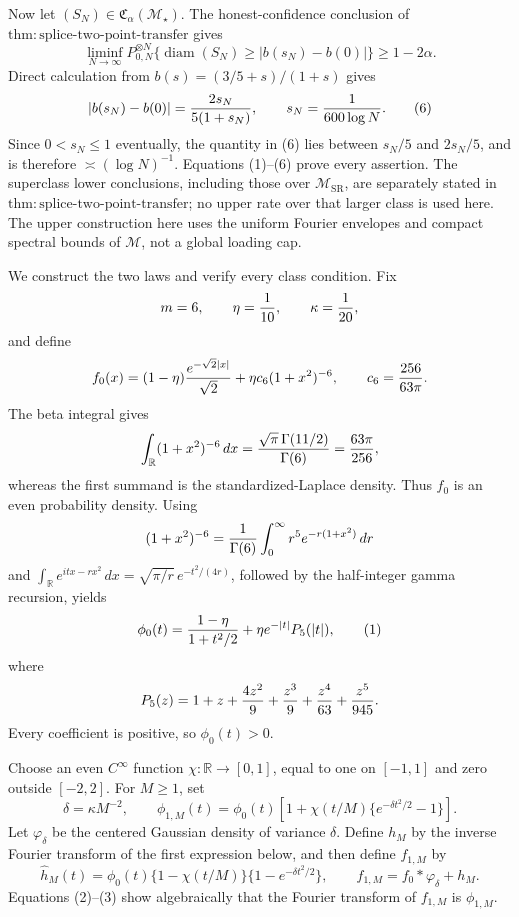 Now let \((S_N)\in\mathfrak C_\alpha(\mathcal M_\star)\).  The honest-confidence conclusion of \(\mathrm{thm:splice\text{-}two\text{-}point\text{-}transfer}\) gives
\[
 \liminf_{N\to\infty}P_{0,N}^{\otimes N}
 \{\operatorname{diam}(S_N)\ge|b(s_N)-b(0)|\}
 \ge1-2\alpha. \tag{5}
\]
Direct calculation from \(b(s)=(3/5+s)/(1+s)\) gives
\[
 |b(s_N)-b(0)|={2s_N\over5(1+s_N)},
 \qquad s_N={1\over600\log N}. \tag{6}
\]
Since \(0<s_N\le1\) eventually, the quantity in (6) lies between \(s_N/5\) and \(2s_N/5\), and is therefore \(\asymp(\log N)^{-1}\).  Equations (1)--(6) prove every assertion.  The superclass lower conclusions, including those over \(\mathcal M_{\mathrm{SR}}\), are separately stated in \(\mathrm{thm:splice\text{-}two\text{-}point\text{-}transfer}\); no upper rate over that larger class is used here.  The upper construction here uses the uniform Fourier envelopes and compact spectral bounds of \(\mathcal M\), not a global loading cap.

We construct the two laws and verify every class condition.  Fix
\[
 m=6,\qquad \eta={1\over10},\qquad \kappa={1\over20},
\]
and define
\[
 f_0(x)=(1-\eta){e^{-\sqrt2|x|}\over\sqrt2}
       +\eta c_6(1+x^2)^{-6},
 \qquad c_6={256\over63\pi}.
\]
The beta integral gives
\[
 \int_{\mathbb R}(1+x^2)^{-6}\,dx
 ={\sqrt\pi\,\Gamma(11/2)\over\Gamma(6)}={63\pi\over256},
\]
whereas the first summand is the standardized-Laplace density.  Thus \(f_0\) is an even probability density.  Using
\[
 (1+x^2)^{-6}={1\over\Gamma(6)}
 \int_0^\infty r^5e^{-r(1+x^2)}\,dr
\]
and \(\int_{\mathbb R}e^{itx-rx^2}\,dx=\sqrt{\pi/r}\,e^{-t^2/(4r)}\), followed by the half-integer gamma recursion, yields
\[
 \phi_0(t)={1-\eta\over1+t^2/2}+\eta e^{-|t|}P_5(|t|), \tag{1}
\]
where
\[
 P_5(z)=1+z+{4z^2\over9}+{z^3\over9}
       +{z^4\over63}+{z^5\over945}.
\]
Every coefficient is positive, so \(\phi_0(t)>0\).

Choose an even \(C^\infty\) function \(\chi:\mathbb R\to[0,1]\), equal to one on \([-1,1]\) and zero outside \([-2,2]\).  For \(M\ge1\), set
\[
 \delta=\kappa M^{-2},\qquad
 \phi_{1,M}(t)=\phi_0(t)
 \left[1+\chi(t/M)\{e^{-\delta t^2/2}-1\}\right]. \tag{2}
\]
Let \(\varphi_\delta\) be the centered Gaussian density of variance \(\delta\).  Define \(h_M\) by the inverse Fourier transform of the first expression below, and then define \(f_{1,M}\) by
\[
 \widehat h_M(t)=\phi_0(t)\{1-\chi(t/M)\}
                 \{1-e^{-\delta t^2/2}\},
 \qquad f_{1,M}=f_0*\varphi_\delta+h_M. \tag{3}
\]
Equations (2)--(3) show algebraically that the Fourier transform of \(f_{1,M}\) is \(\phi_{1,M}\).

